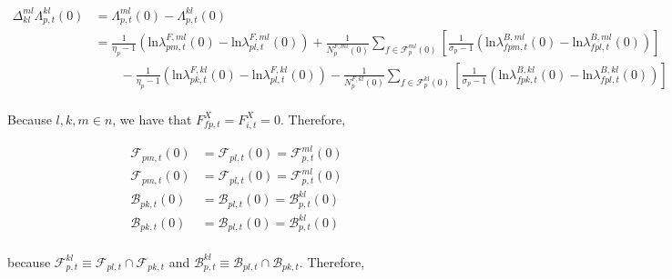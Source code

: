 \begin{linenomath*}
    \begin{equation*}
        \begin{aligned}
            \Delta_{kl}^{ml}\Lambda_{p,t}^{kl}(0) 
                &= \Lambda_{p,t}^{ml}(0) - \Lambda_{p,t}^{kl}(0) \\
                &=  \frac{1}{\eta_p-1} 
                    \left(\text{ln} \lambda^{F,ml}_{pm,t}(0) - \text{ln}\lambda^{F,ml}_{pl,t}(0) \right)
                    +   \frac{1}{N^{F,ml}_{p}(0)} \sum_{f \in \mathcal{F}^{ml}_{p}(0)} 
                            \left[
                            \frac{1}{\sigma_p-1} 
                            \left(\text{ln} \lambda^{B,ml}_{fpm,t}(0) - \text{ln}\lambda^{B,ml}_{fpl,t}(0) \right)  
                        \right] \\
                & \qquad - 
                        \frac{1}{\eta_p-1} 
                        \left(\text{ln} \lambda^{F,kl}_{pk,t}(0) - \text{ln}\lambda^{F,kl}_{pl,t}(0) \right)
                        -   \frac{1}{N^{F,kl}_{p}(0)} \sum_{f \in \mathcal{F}^{kl}_{p}(0)} 
                                \left[
                                \frac{1}{\sigma_p-1} 
                                \left(\text{ln} \lambda^{B,kl}_{fpk,t}(0) - \text{ln}\lambda^{B,kl}_{fpl,t}(0) \right)  
                            \right] \\
        \end{aligned}
    \end{equation*}
\end{linenomath*}
Because $l,k,m \in n$, we have that $F^X_{fp,t} = F^X_{i,t} = 0$. Therefore, 
\begin{linenomath*}
    \begin{equation*}
        \begin{aligned}
            \mathcal{F}_{pm,t}(0) &= \mathcal{F}_{pl,t}(0) = \mathcal{F}^{ml}_{p,t}(0) \\
            \mathcal{F}_{pm,t}(0) &= \mathcal{F}_{pl,t}(0) = \mathcal{F}^{ml}_{p,t}(0) \\
            \mathcal{B}_{pk,t}(0) &= \mathcal{B}_{pl,t}(0) = \mathcal{B}^{kl}_{p,t}(0) \\
            \mathcal{B}_{pk,t}(0) &= \mathcal{B}_{pl,t}(0) = \mathcal{B}^{kl}_{p,t}(0) \\
        \end{aligned}
    \end{equation*}
\end{linenomath*}  
because $\mathcal{F}^{kl}_{p,t} \equiv \mathcal{F}_{pl,t} \cap \mathcal{F}_{pk,t}$ and $\mathcal{B}^{kl}_{p,t} \equiv \mathcal{B}_{pl,t} \cap \mathcal{B}_{pk,t}$. Therefore, 
